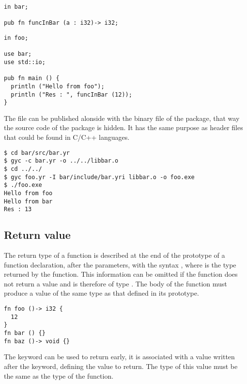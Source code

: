 \begin{lstlisting}[caption=\textit{./bar/include/bar.yri}, style=coloredverbatim]
in bar;

pub fn funcInBar (a : i32)-> i32;
\end{lstlisting}
\begin{lstlisting}[caption=\textit{foo.yr}, style=coloredverbatim]
in foo;

use bar;
use std::io;

pub fn main () {
  println ("Hello from foo");
  println ("Res : ", funcInBar (12));
}
\end{lstlisting}


The file  can be published alonside with the
binary file of the  package, that way the source code of the package
 is hidden. It has the same purpose as header files that could be
found in C/C++ languages.

\begin{lstlisting}[style=intermediateVerb]
$ cd bar/src/bar.yr
$ gyc -c bar.yr -o ../../libbar.o
$ cd ../../
$ gyc foo.yr -I bar/include/bar.yri libbar.o -o foo.exe
$ ./foo.exe
Hello from foo
Hello from bar
Res : 13
\end{lstlisting}

\subsection {Return value}

The return type of a function is described at the end of the prototype of a
function declaration, after the parameters, with the syntax , where
 is the type returned by the function. This information can be omitted
if the function does not return a value and is therefore of type .
The body of the function must produce a value of the same type as that defined
in its prototype.

\begin{lstlisting}[style=coloredverbatim]
fn foo ()-> i32 {
  12
}
fn bar () {}
fn baz ()-> void {}
\end{lstlisting}

The keyword  can be used to return early, it is associated with a
value written after the keyword, defining the value to return. The type of this
value must be the same as the type of the function.

